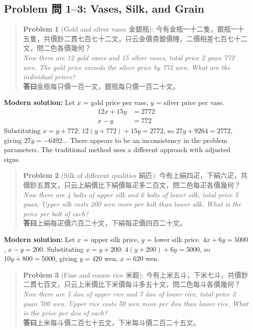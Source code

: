 \documentclass[11pt,a4paper]{article}
\newenvironment{problembox}{%
  \begin{quote}
  \itshape
  \color{problemcolor}
}{%
  \end{quote}
}
\begin{document}
\subsection{Problem 問 1--3: Vases, Silk, and Grain}

\begin{problembox}
\textbf{Problem 1} (Gold and silver vases 金銀瓶): 今有金瓶一十二隻，銀瓶一十五隻，共價鈔二貫七百七十二文，只云金價貴銀價賤，二價相差七百七十二文，問二色各價幾何？\\[0.2cm]
\textit{Now there are 12 gold vases and 15 silver vases, total price 2 guan 772 wen. The gold price exceeds the silver price by 772 wen. What are the individual prices?}\\[0.2cm]
\textbf{答曰}金瓶每只價一百一文，銀瓶每只價一百二十文。
\end{problembox}

\textbf{Modern solution:} Let $x$ = gold price per vase, $y$ = silver price per vase.
\begin{align*}
12x + 15y &= 2772 \\
x - y &= 772
\end{align*}
Substituting $x = y + 772$: $12(y+772) + 15y = 2772$, so $27y + 9264 = 2772$, giving $27y = -6492$... There appears to be an inconsistency in the problem parameters. The traditional method uses a different approach with adjusted signs.

\vspace{0.3cm}

\begin{problembox}
\textbf{Problem 2} (Silk of different qualities 絹匹): 今有上絹四疋，下絹六疋，共價鈔五貫文，只云上絹價比下絹價每疋多二百文，問二色每疋各價幾何？\\[0.2cm]
\textit{Now there are 4 bolts of upper silk and 6 bolts of lower silk, total price 5 guan. Upper silk costs 200 wen more per bolt than lower silk. What is the price per bolt of each?}\\[0.2cm]
\textbf{答曰}上絹每疋價六百二十文，下絹每疋價四百二十文。
\end{problembox}

\textbf{Modern solution:} Let $x$ = upper silk price, $y$ = lower silk price. $4x + 6y = 5000$, $x - y = 200$. Substituting $x = y + 200$: $4(y+200) + 6y = 5000$, so $10y + 800 = 5000$, giving $y = 420$ wen, $x = 620$ wen.

\vspace{0.3cm}

\begin{problembox}
\textbf{Problem 3} (Fine and coarse rice 米穀): 今有上米五斗，下米七斗，共價鈔二貫七百文，只云上米價比下米價每斗多五十文，問二色每斗各價幾何？\\[0.2cm]
\textit{Now there are 5 dou of upper rice and 7 dou of lower rice, total price 2 guan 700 wen. Upper rice costs 50 wen more per dou than lower rice. What is the price per dou of each?}\\[0.2cm]
\textbf{答曰}上米每斗價二百七十五文，下米每斗價二百二十五文。
\end{problembox}
\end{document}
